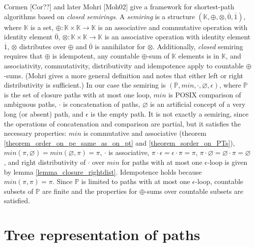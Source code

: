\documentclass[AMA,STIX1COL]{WileyNJD-v2}
\newcommand{\YK}{\mathbb{K}}
\newcommand{\YP}{\mathbb{P}}
\newcommand*{\Xbar}[1]{\overline{#1}}
\begin{document}
Cormen [Cor??] and later Mohri [Moh02] give a framework for shortest-path algorithms based on \emph{closed semirings}.
%
A \emph{semiring} is a structure $(\YK, \oplus, \otimes, \Xbar{0}, \Xbar{1})$, where
$\YK$ is a set,
$\oplus \!\!:\!\! \YK \times \YK \rightarrow \YK$ is an associative and commutative operation with identity element $\Xbar{0}$,
$\otimes \!\!:\!\! \YK \times \YK \rightarrow \YK$ is an associative operation with identity element $\Xbar{1}$,
$\otimes$ distributes over $\oplus$
and $\Xbar{0}$ is annihilator for $\otimes$.
%
Additionally, \emph{closed} semiring requires that
$\oplus$ is idempotent,
any countable $\oplus$-sum of $\YK$ elements is in $\YK$,
and associativity, commutativity, distributivity and idempotence apply to countable $\oplus$-sums.
(Mohri gives a more general definition and notes that either left or right distributivity is sufficient.)
%
In our case the semiring is $(\YP, min, \cdot, \varnothing, \epsilon)$, where
$\YP$ is the set of closure paths with at most one loop,
$min$ is POSIX comparison of ambiguous paths,
$\cdot$ is concatenation of paths,
$\varnothing$ is an artificial concept of a very long (or absent) path,
and $\epsilon$ is the empty path.
%
It is not exactly a semiring, since the operations of concatenation and comparison are partial,
but it satisfies the necessary properties:
$min$ is commutative and associative (theorem \ref{theorem_order_on_pe_same_as_on_pt} and \ref{theorem_sorder_on_PTs}),
$min(\pi, \varnothing) = min(\varnothing, \pi) = \pi$,
$\cdot$ is associative, $\pi \cdot \epsilon = \epsilon \cdot \pi = \pi$,
$\pi \cdot \varnothing = \varnothing \cdot \pi = \varnothing$,
and right distributivity of $\cdot$ over $min$ for paths with at most one $\epsilon$-loop is given by lemma \ref{lemma_closure_rightdist}.
%
Idempotence holds because $min(\pi, \pi) = \pi$.
%
Since $\YP$ is limited to paths with at most one $\epsilon$-loop,
countable subsets of $\YP$ are finite
and the properties for $\oplus$-sums over countable subsets are satisfied.
\\

\section{Tree representation of paths}\label{section_pathtree}
\end{document}
